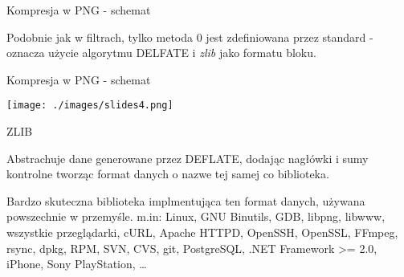 \documentclass[presentation]{beamer}
\begin{document}
\begin{frame}[label={sec:orgf20e3ae}]{Kompresja w PNG - schemat}
\begin{block}{Podobnie jak w filtrach, tylko metoda 0 jest zdefiniowana przez standard - oznacza użycie algorytmu DELFATE i \emph{zlib} jako formatu bloku.}
\end{block}
\end{frame}

\begin{frame}[label={sec:orgf5d4440}]{Kompresja w PNG - schemat}
\begin{center}
\texttt{[image: ./images/slides4.png]}
\end{center}
\end{frame}

\begin{frame}[label={sec:org9e0e0af}]{ZLIB}
\begin{block}{Abstrachuje dane generowane przez DEFLATE, dodając nagłówki i sumy kontrolne tworząc format danych o nazwe tej samej co biblioteka.}
\end{block}
\begin{block}{Bardzo skuteczna biblioteka implmentująca ten format danych, używana powszechnie w przemyśle.}
m.in: Linux, GNU Binutils, GDB, libpng, libwww, wszystkie
przeglądarki, cURL, Apache HTTPD, OpenSSH, OpenSSL, FFmpeg, rsync,
dpkg, RPM, SVN, CVS, git, PostgreSQL, .NET Framework >= 2.0,
iPhone, Sony PlayStation, \ldots{}
\end{block}
\end{frame}
\end{document}
